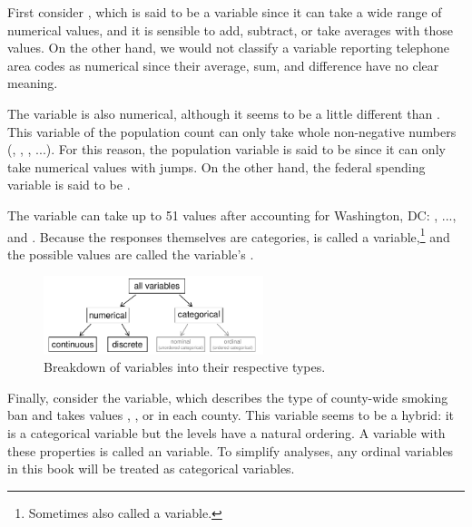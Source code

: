 First consider , which is said to be a  variable since it can take a wide range of numerical values, and it is sensible to add, subtract, or take averages with those values. On the other hand, we would not classify a variable reporting telephone area codes as numerical since their average, sum, and difference have no clear meaning.

The  variable is also numerical, although it seems to be a little different than . This variable of the population count can only take whole non-negative numbers (, , , ...). For this reason, the population variable is said to be  since it can only take numerical values with jumps. On the other hand, the federal spending variable is said to be .

The variable  can take up to 51 values after accounting for Washington, DC: , ..., and . Because the responses themselves are categories,  is called a  variable,\footnote{Sometimes also called a  variable.} and the possible values are called the variable's .

\begin{figure}
\centering
\includegraphics[width=0.57\textwidth]{ch_data_collection/figures/variables/variables}
\caption{Breakdown of variables into their respective types.}
\label{variables}
\end{figure}

Finally, consider the  variable, which describes the type of county-wide smoking ban and takes values , , or  in each county. This variable seems to be a hybrid: it is a categorical variable but the levels have a natural ordering. A variable with these properties is called an  variable. To simplify analyses, any ordinal variables in this book will be treated as categorical variables.

